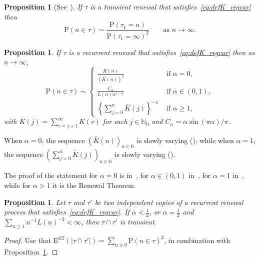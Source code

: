 \documentclass[11pt]{article}
\newtheorem{prop}[theo]{Proposition}
\theoremstyle{definition}
\numberwithin{equation}{section}
\numberwithin{figure}{section}
\numberwithin{table}{section}
\newcommand{\bbN}{{\ensuremath{\mathbb N}}}
\newcommand{\ga}{\alpha}
\newcommand\bP{\ensuremath{\mathrm{P}}}
\newcommand\bE{\ensuremath{\mathrm{E}}}
\newcommand*{\MK}{\mkern 2mu}
\begin{document}
\begin{prop}[{See~\cite[Theorem~A.4, Appendix~A.5.2]{Gi2007}}]
If $\tau$ is a transient renewal that satisfies~\eqref{eq:defK_regvar} then
\begin{equation}
\bP(n \in \tau) \sim \frac{\bP(\tau_1 = n)}{\bP(\tau_1 = \infty)^2} \qquad \text{as } n \to \infty.
\end{equation}
\end{prop}

\begin{prop}\label{RMassFunctionProp}
If $\tau$ is a recurrent renewal that satisfies~\eqref{eq:defK_regvar} then as $n \to \infty$,
\begin{equation}\label{RMassFunction}
\bP(n \in \tau) \sim
\begin{cases}
\frac{K(n)}{(\bar K(n))^2} & \text{ if } \ga = 0,\\[4pt]
\frac{C_\ga}{L(n) n^{1 - \ga}} & \text{ if } \ga \in (0,1),\\[4pt]
\left\{ \sum_{j=0}^n \bar K(j) \right\}^{-1} & \text{ if } \ga \geq 1,
\end{cases}
\end{equation}
with $\bar K(j) = \sum_{r=j+1}^\infty K(r)$ for each $j\in\bbN_0$ and $C_\ga = \ga \sin(\pi \ga)/\pi$.
\end{prop}

When $\ga = 0$, the sequence $(\bar K(n))_{n\in\bbN}$ is slowly varying (\cite[Propos-\linebreak ition~1.5.9$\MK$(b)]{BGT89}), while when $\ga = 1$, the sequence $(\sum_{j=0}^ n \bar K(j))_{n\in\bbN}$ is slowly varying (\cite[Prop\-os\-itions~1.5.10 and~1.5.9$\MK$(a)]{BGT89}).

The proof of the statement for $\ga = 0$ is in~\cite[Theorem~1.1]{Na2012}, for $\ga \in (0,1)$ in~\cite[Theorem~1.1]{GL63}, for $\ga = 1$ in~\cite[Theorem~8.7.5]{BGT89}, while for $\ga > 1$ it is the Renewal Theorem.

\begin{prop}\label{pr:transient.inter}
Let $\tau$ and $\tau'$ be two independent copies of a recurrent renewal process that satisfies~\eqref{eq:defK_regvar}. If $\ga < \frac{1}{2}$, or $\ga = \frac{1}{2}$ and $\sum_{n\geq1} n^{-1} L(n)^{-2} < \infty$, then $\tau \cap \tau'$ is transient.
\end{prop}

\begin{proof}
Use that $\bE^{\otimes 2}(|\tau \cap \tau'|) = \sum_{n\geq0} \bP(n \in \tau)^2$, in combination with Prop\-os\-ition~\ref{RMassFunctionProp}.
\end{proof}
\end{document}
